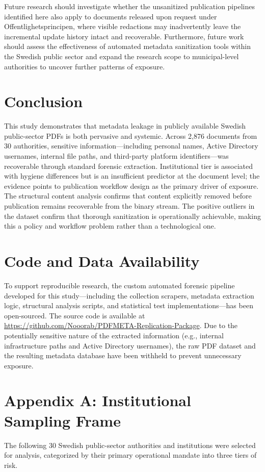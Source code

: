 \documentclass[conference]{IEEEtran}
\begin{document}
Future research should investigate whether the unsanitized publication pipelines identified here also apply to documents released upon request under Offentlighetsprincipen, where visible redactions may inadvertently leave the incremental update history intact and recoverable. Furthermore, future work should assess the effectiveness of automated metadata sanitization tools within the Swedish public sector and expand the research scope to municipal-level authorities to uncover further patterns of exposure.
\section{Conclusion}
This study demonstrates that metadata leakage in publicly available Swedish public-sector PDFs is both pervasive and systemic. Across 2,876 documents from 30 authorities, sensitive information---including personal names, Active Directory usernames, internal file paths, and third-party platform identifiers---was recoverable through standard forensic extraction. Institutional tier is associated with hygiene differences but is an insufficient predictor at the document level; the evidence points to publication workflow design as the primary driver of exposure. The structural content analysis confirms that content explicitly removed before publication remains recoverable from the binary stream. The positive outliers in the dataset confirm that thorough sanitization is operationally achievable, making this a policy and workflow problem rather than a technological one.
\section*{Code and Data Availability}
To support reproducible research, the custom automated forensic pipeline developed for this study---including the collection scrapers, metadata extraction logic, structural analysis scripts, and statistical test implementations---has been open-sourced. The source code is available at \url{https://github.com/Nooorab/PDFMETA-Replication-Package}. Due to the potentially sensitive nature of the extracted information (e.g., internal infrastructure paths and Active Directory usernames), the raw PDF dataset and the resulting metadata database have been withheld to prevent unnecessary exposure.




\newpage
\section*{Appendix A: Institutional Sampling Frame}
The following 30 Swedish public-sector authorities and institutions were selected for analysis, categorized by their primary operational mandate into three tiers of risk.
\end{document}
